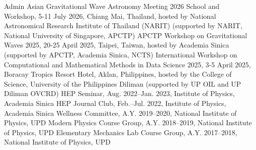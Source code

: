 \begin{rubric}{Admin}
 Asian Gravitational Wave Astronomy Meeting 2026 School and Workshop, 5-11 July 2026, Chiang Mai, Thailand, hosted by National Astronomical Research Institute of Thailand (NARIT) (supported by NARIT, National University of Singapore, APCTP)
 APCTP Workshop on Gravitational Waves 2025, 20-25 April 2025, Taipei, Taiwan, hosted by Academia Sinica (supported by APCTP, Academia Sinica, NCTS)
 International Workshop on Computational and Mathematical Methods in Data Science 2025, 3-5 April 2025, Boracay Tropics Resort Hotel, Aklan, Philippines, hosted by the College of Science, University of the Philippines Diliman (supported by UP OIL and UP Diliman OVCRD)
\entry*[Organizer]
	HEP Seminar, Aug. 2022--Jan. 2023, Institute of Physics, Academia Sinica
\entry*[Organizer]
	HEP Journal Club, Feb.--Jul. 2022, Institute of Physics, Academia Sinica
\entry*[Head]
	Wellness Committee, A.Y. 2019--2020, National Institute of Physics, UPD
\entry*[Head]
	Modern Physics Course Group, A.Y. 2018--2019, National Institute of Physics, UPD
\entry*[Head]
	Elementary Mechanics Lab Course Group, A.Y. 2017--2018, National Institute of Physics, UPD
\end{rubric}